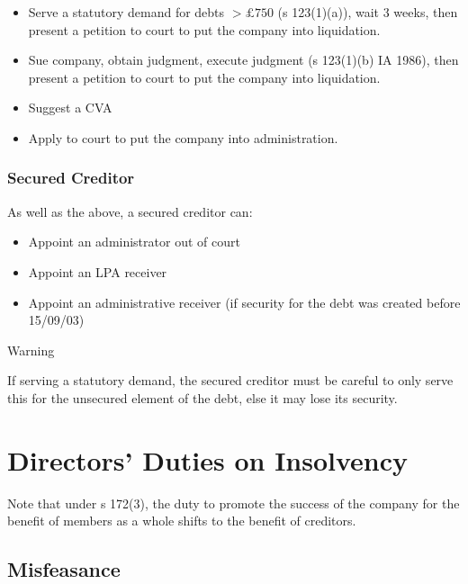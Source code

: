 \documentclass[
]{article}
\providecommand{\tightlist}{%
  \setlength{\itemsep}{0pt}\setlength{\parskip}{0pt}}
\newenvironment{env-c2ea7781-55a7-40ef-9219-ca9616c6b82e}
{
    \savenotes\tcolorbox[blanker,breakable,left=5pt,borderline west={2pt}{-4pt}{orange}]
}
{
    \endtcolorbox\spewnotes
}
\begin{document}
\begin{itemize}
\tightlist
\item
  Serve a statutory demand for debts {\(> \pounds 750\)} (s 123(1)(a)),
  wait 3 weeks, then present a petition to court to put the company into
  liquidation.
\item
  Sue company, obtain judgment, execute judgment (s 123(1)(b) IA 1986),
  then present a petition to court to put the company into liquidation.
\item
  Suggest a CVA
\item
  Apply to court to put the company into administration.
\end{itemize}

\hypertarget{secured-creditor}{%
\subsubsection{Secured Creditor}\label{secured-creditor}}

As well as the above, a secured creditor can:

\begin{itemize}
\tightlist
\item
  Appoint an administrator out of court
\item
  Appoint an LPA receiver
\item
  Appoint an administrative receiver (if security for the debt was
  created before 15/09/03)
\end{itemize}

\begin{env-c2ea7781-55a7-40ef-9219-ca9616c6b82e}

Warning

If serving a statutory demand, the secured creditor must be careful to
only serve this for the unsecured element of the debt, else it may lose
its security.

\end{env-c2ea7781-55a7-40ef-9219-ca9616c6b82e}

\hypertarget{directors-duties-on-insolvency}{%
\section{Directors' Duties on
Insolvency}\label{directors-duties-on-insolvency}}

Note that under s 172(3), the duty to promote the success of the company
for the benefit of members as a whole shifts to the benefit of
creditors.

\hypertarget{misfeasance}{%
\subsection{Misfeasance}\label{misfeasance}}
\end{document}
